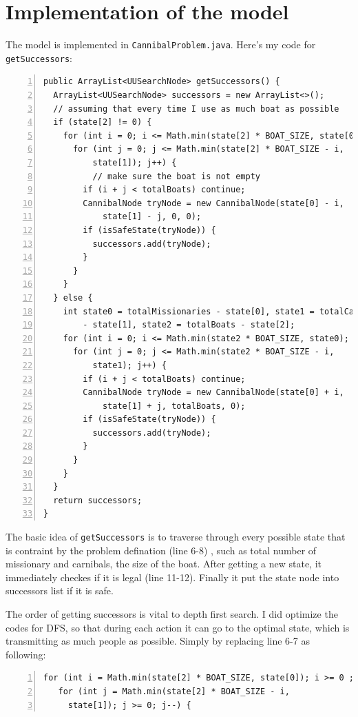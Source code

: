 \documentclass{article}
\begin{document}
\section{Implementation of the model}

The model is implemented in 
\verb`CannibalProblem.java`.  Here's my code for \verb`getSuccessors`:

\begin{lstlisting}[numbers=left]
public ArrayList<UUSearchNode> getSuccessors() {
  ArrayList<UUSearchNode> successors = new ArrayList<>();
  // assuming that every time I use as much boat as possible
  if (state[2] != 0) {
    for (int i = 0; i <= Math.min(state[2] * BOAT_SIZE, state[0]); i++) {
      for (int j = 0; j <= Math.min(state[2] * BOAT_SIZE - i,
          state[1]); j++) {
          // make sure the boat is not empty
        if (i + j < totalBoats)	continue;
        CannibalNode tryNode = new CannibalNode(state[0] - i,
            state[1] - j, 0, 0);
        if (isSafeState(tryNode)) {
          successors.add(tryNode);
        }
      }
    }
  } else {
    int state0 = totalMissionaries - state[0], state1 = totalCannibals
        - state[1], state2 = totalBoats - state[2];
    for (int i = 0; i <= Math.min(state2 * BOAT_SIZE, state0); i++) {
      for (int j = 0; j <= Math.min(state2 * BOAT_SIZE - i,
          state1); j++) {
        if (i + j < totalBoats)	continue;
        CannibalNode tryNode = new CannibalNode(state[0] + i,
            state[1] + j, totalBoats, 0);
        if (isSafeState(tryNode)) {
          successors.add(tryNode);
        }
      }
    }
  }
  return successors;
}
\end{lstlisting}

The basic idea of \verb`getSuccessors` is to traverse through every possible state that is contraint by the problem defination (line 6-8) , such as total number of missionary and carnibals, the size of the boat. After getting a new state, it immediately checkes if it is legal (line 11-12). Finally it put the state node into successors list if it is safe.

The order of getting successors is vital to depth first search. I did optimize the codes for DFS, so that during each action it can go to the optimal state, which is transmitting as much people as possible. Simply by replacing line 6-7 as following:

\begin{lstlisting}[numbers=left]
 for (int i = Math.min(state[2] * BOAT_SIZE, state[0]); i >= 0 ; i--) {
   for (int j = Math.min(state[2] * BOAT_SIZE - i,
     state[1]); j >= 0; j--) {
\end{lstlisting}
\end{document}

